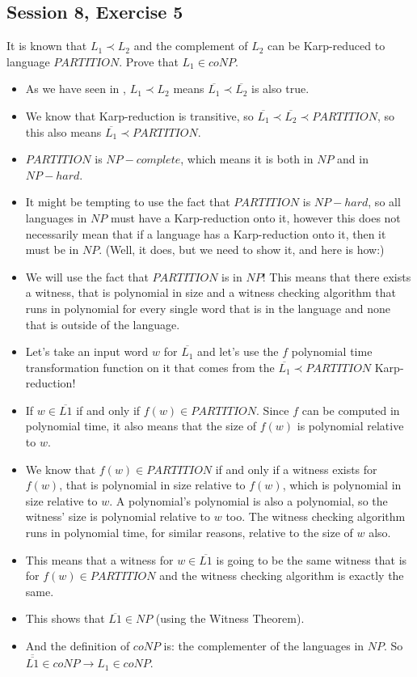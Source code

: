 \subsection {Session 8, Exercise 5}
\label{8_5}


It is known that $L_1 \prec L_2$ and the complement of $L_2$ can be Karp-reduced to language $PARTITION$. Prove that $L_1 \in{} coNP$.


\begin{itemize}
    \item As we have seen in , $L_1 \prec L_2$ means $\overline{L_1} \prec \overline{L_2}$ is also true.
    \item We know that Karp-reduction is transitive, so $\overline{L_1} \prec \overline{L_2} \prec PARTITION$, so this also means $\overline{L_1} \prec PARTITION$.
    \item $PARTITION$ is $NP-complete$, which means it is both in $NP$ and in $NP-hard$.
    \item It might be tempting to use the fact that $PARTITION$ is $NP-hard$, so all languages in $NP$ must have a Karp-reduction onto it, however this does not necessarily mean that if a language has a Karp-reduction onto it, then it must be in $NP$. (Well, it does, but we need to show it, and here is how:)
    \item We will use the fact that $PARTITION$ is in $NP$! This means that there exists a witness, that is polynomial in size and a witness checking algorithm that runs in polynomial for every single word that is in the language and none that is outside of the language.
    \item Let's take an input word $w$ for $\overline{L_1}$ and let's use the $f$ polynomial time transformation function on it that comes from the $\overline{L_1} \prec PARTITION$ Karp-reduction!
    \item If $w \in{} \overline{L1}$ if and only if $f(w)\in{}PARTITION$. Since $f$ can be computed in polynomial time, it also means that the size of $f(w)$ is polynomial relative to $w$.
    \item We know that $f(w)\in{}PARTITION$ if and only if a witness exists for $f(w)$, that is polynomial in size relative to $f(w)$, which is polynomial in size relative to $w$. A polynomial's polynomial is also a polynomial, so the witness' size is polynomial relative to $w$ too. The witness checking algorithm runs in polynomial time, for similar reasons, relative to the size of $w$ also.
    \item This means that a witness for $w\in{}\overline{L1}$ is going to be the same witness that is for $f(w)\in{}PARTITION$ and the witness checking algorithm is exactly the same.
    \item This shows that $\overline{L1} \in{} NP$ (using the Witness Theorem).
    \item And the definition of $coNP$ is: the complementer of the languages in $NP$. So $\overline{\overline{L1}} \in{} coNP \rightarrow L_1 \in{} coNP$. 
\end{itemize}
